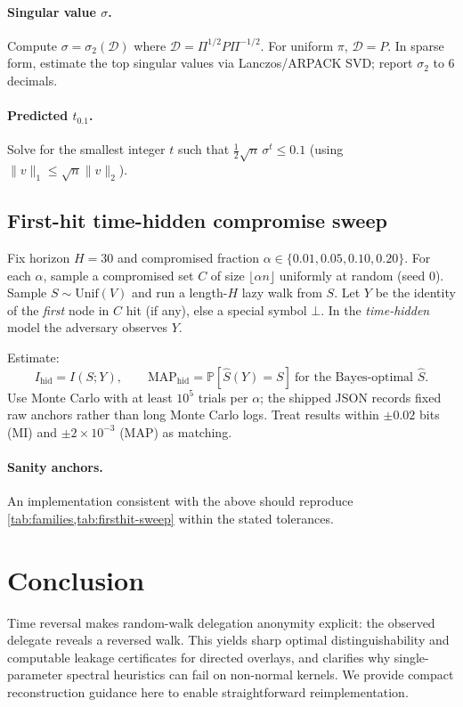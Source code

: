 \documentclass[11pt]{article}
\newcommand{\Prb}{\mathbb{P}}
\newcommand{\Unif}{\mathrm{Unif}}
\newcommand{\cD}{\mathcal{D}}
\begin{document}
\paragraph{Singular value $\sigma$.}
Compute $\sigma=\sigma_2(\cD)$ where $\cD=\Pi^{1/2}P\Pi^{-1/2}$.
For uniform $\pi$, $\cD=P$. In sparse form, estimate the top singular values via
Lanczos/ARPACK SVD; report $\sigma_2$ to 6 decimals.

\paragraph{Predicted $t_{0.1}$.}
Solve for the smallest integer $t$ such that
$\tfrac12\sqrt{n}\,\sigma^{t}\le 0.1$ (using $\|v\|_1\le\sqrt{n}\|v\|_2$).

\subsection{First-hit time-hidden compromise sweep}
Fix horizon $H=30$ and compromised fraction $\alpha\in\{0.01,0.05,0.10,0.20\}$.
For each $\alpha$, sample a compromised set $C$ of size $\lfloor \alpha n\rfloor$
uniformly at random (seed 0). Sample $S\sim\Unif(V)$ and run a length-$H$ lazy
walk from $S$. Let $Y$ be the identity of the \emph{first} node in $C$ hit
(if any), else a special symbol $\bot$. In the \emph{time-hidden} model the
adversary observes $Y$.

Estimate:
\[
I_{\mathrm{hid}} = I(S;Y), \qquad
\mathrm{MAP}_{\mathrm{hid}} = \Prb[\hat S(Y)=S]\ \text{for the Bayes-optimal }\hat S.
\]
Use Monte Carlo with at least $10^5$ trials per $\alpha$; the shipped JSON records fixed raw anchors rather than long Monte Carlo logs.
Treat results within $\pm 0.02$ bits (MI) and $\pm 2\times10^{-3}$ (MAP) as matching.

\paragraph{Sanity anchors.}
An implementation consistent with the above should reproduce
\cref{tab:families,tab:firsthit-sweep} within the stated tolerances.

\section{Conclusion}
Time reversal makes random-walk delegation anonymity explicit: the observed
delegate reveals a reversed walk. This yields sharp optimal distinguishability
and computable leakage certificates for directed overlays, and clarifies why
single-parameter spectral heuristics can fail on non-normal kernels. We provide
compact reconstruction guidance here to enable straightforward reimplementation.
\end{document}
